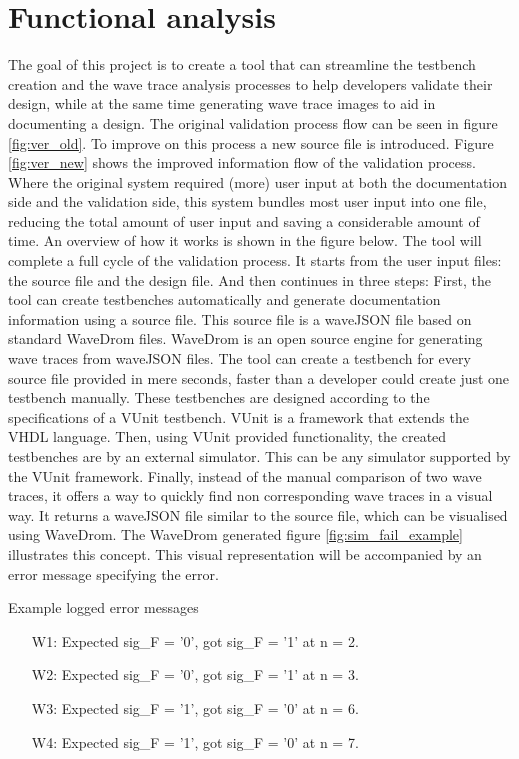 \chapter{Functional analysis} \label{FA}
The goal of this project is to create a tool that can streamline the testbench creation and the wave trace analysis processes to help developers validate their design, while at the same time generating wave trace images to aid in documenting a design. The original validation process flow can be seen in figure \ref{fig:ver_old}. To improve on this process a new source file is introduced. Figure \ref{fig:ver_new} shows the improved information flow of the validation process. Where the original system required (more) user input at both the documentation side and the validation side, this system bundles most user input into one file, reducing the total amount of user input and saving a considerable amount of time. An overview of how it works is shown in the figure below.%
\newpage
{}\noindent
The tool will complete a full cycle of the validation process. It starts from the user input files: the source file and the design file. And then continues in three steps:
\npar
First, the tool can create testbenches automatically and generate documentation information using a source file. This source file is a waveJSON \cite{wavejson} file based on standard WaveDrom \cite{wavedrom} files. WaveDrom is an open source engine for generating wave traces from waveJSON files. The tool can create a testbench for every source file provided in mere seconds, faster than a developer could create just one testbench manually. These testbenches are designed according to the specifications of a VUnit \cite{vunit} testbench. VUnit is a framework that extends the VHDL language.\newpage
\npar
Then, using VUnit provided functionality, the created testbenches are by an external simulator. This can be any simulator supported by the VUnit framework.
\npar
Finally, instead of the manual comparison of two wave traces, it offers a way to quickly find non corresponding wave traces in a visual way. It returns a waveJSON file similar to the source file, which can be visualised using WaveDrom. The WaveDrom generated figure \ref{fig:sim_fail_example} illustrates this concept. This visual representation will be accompanied by an error message specifying the error.%
\begin{customenv}
	\caption{Example logged error messages}\label{log:example}
	\begin{itemize}
		\centering
		\item [W1:] Expected sig\_F =  '0',  got sig\_F =  '1' at n = 2.
		\item [W2:] Expected sig\_F =  '0',  got sig\_F =  '1' at n = 3.
		\item [W3:] Expected sig\_F =  '1',  got sig\_F =  '0' at n = 6.
		\item [W4:] Expected sig\_F =  '1',  got sig\_F =  '0' at n = 7.
	\end{itemize}
\end{customenv}\newpage\noindent
